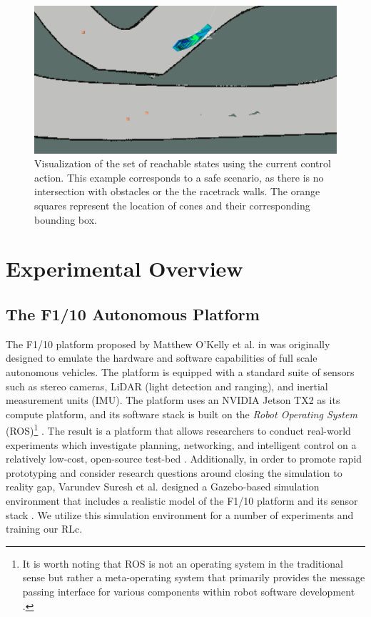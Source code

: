 \documentclass[manuscript,screen,review]{acmart}
\begin{document}
\begin{figure}[htpb]%
  \centering
    \includegraphics[width=0.9\linewidth]{figures/reach_vis_one.png}
   \caption{Visualization of the set of reachable states using the current control action. This example corresponds to a safe scenario, as there is no intersection with obstacles or the the racetrack walls. The orange squares represent the location of cones and their corresponding bounding box.}
  \label{fig:reachset}
\end{figure}



\section{Experimental Overview}

\subsection{The F1/10 Autonomous Platform}

The F1/10 platform proposed by Matthew O'Kelly et al. in \cite{F1102019,marshall_2019} was originally designed to emulate the hardware and software capabilities of full scale autonomous vehicles. The platform is equipped with a standard suite of sensors such as stereo cameras, LiDAR (light detection and ranging), and inertial measurement units (IMU). The platform uses an NVIDIA Jetson TX2 as its compute platform, and its software stack is built on the \emph{Robot Operating System} (ROS)\footnote{It is worth noting that ROS is not an operating system in the traditional sense but rather a meta-operating system that primarily provides the message passing interface for various components within robot software development \cite{Huang2014}.} \cite{ROS}. The result is a platform that allows researchers to conduct real-world experiments which investigate planning, networking, and intelligent control on a relatively low-cost, open-source test-bed \cite{F1102019}. Additionally, in order to promote rapid prototyping and consider research questions around closing the simulation to reality gap\cite{Muratore2019}, Varundev Suresh et al. designed a Gazebo-based simulation environment \cite{Gazebo} that includes a realistic model of the F1/10 platform and its sensor stack \cite{varundev_ros_19}. We utilize this simulation environment for a number of experiments and training our RLc.
\end{document}
